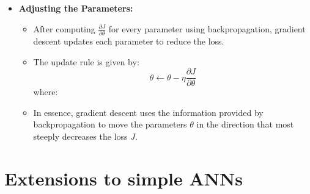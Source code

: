 \documentclass{article}
\begin{document}
\begin{enumerate}
\begin{itemize}
            \item \textbf{Adjusting the Parameters:}
                \begin{itemize}
                    \item After computing \(\frac{\partial J}{\partial \theta}\) for every parameter using backpropagation, gradient descent updates each parameter to reduce the loss.
                    \item The update rule is given by:
                        \[
                        \theta \leftarrow \theta - \eta \frac{\partial J}{\partial \theta}
                        \]
                        where:
                    \item In essence, gradient descent uses the information provided by backpropagation to move the parameters \(\theta\) in the direction that most steeply decreases the loss \(J\).
                \end{itemize}
        \end{itemize}
    
\end{enumerate}

\section{Extensions to simple ANNs}
\end{document}
